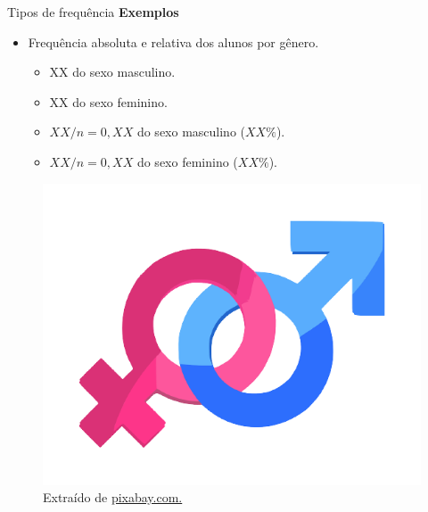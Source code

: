 \documentclass[
  ignorenonframetext,
  serif,
  professionalfont,
  usenames,
  dvipsnames,
  aspectratio = 169]{beamer}
\providecommand{\tightlist}{%
  \setlength{\itemsep}{0pt}\setlength{\parskip}{0pt}}
\renewcommand{\tightlist}{%
  \setlength{\itemsep}{0\baselineskip}
  \setlength{\parskip}{0.25\baselineskip}
}
\def\beginAHalfColumn{\begin{minipage}{0.49\textwidth}}%
\def\endColumns{\end{minipage}}%
\begin{document}
\begin{frame}{Tipos de frequência}
\protect\hypertarget{tipos-de-frequuxeancia-1}{}
\textbf{Exemplos}

\beginAHalfColumn

\begin{itemize}
\tightlist
\item
  Frequência absoluta e relativa dos alunos por gênero.

  \begin{itemize}
  \item
    XX do sexo masculino.
  \item
    XX do sexo feminino.
  \item
    \(XX/n = 0,XX\) do sexo masculino (\(XX\%\)).
  \item
    \(XX/n = 0,XX\) do sexo feminino (\(XX\%\)).
  \end{itemize}
\end{itemize}

\endColumns
\beginAHalfColumn

\begin{figure}

{\centering \includegraphics[width=0.8\linewidth]{./img/generos2} 

}

\caption{Extraído de \href{https://cdn.pixabay.com/photo/2014/04/03/11/52/gender-312411_1280.png}{pixabay.com.}}\label{fig:unnamed-chunk-4}
\end{figure}

\endColumns
\end{frame}
\end{document}
